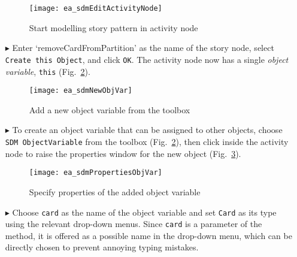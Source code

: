 \begin{itemize}
\begin{figure}[htpb]
\begin{center} 
  \texttt{[image: ea\_sdmEditActivityNode]}
  \caption{Start modelling story pattern in activity node}  
  \label{fig:story_pattern}
\end{center}
\end{figure}

\vspace{0.5cm}

\item[$\blacktriangleright$] Enter `removeCardFromPartition' as the name of the story node, select \texttt{Create this Object}, and click \texttt{OK}. The
activity node now has a single \emph{object variable}, \texttt{this} (Fig.~\ref{fig:tool_box}).

\begin{figure}[htp]
\begin{center}
  \texttt{[image: ea\_sdmNewObjVar]}
  \caption{Add a new object variable from the toolbox}  
  \label{fig:tool_box}
\end{center}
\end{figure}

\newpage

\item[$\blacktriangleright$] To create an object variable that can be assigned to other objects, choose \texttt{SDM ObjectVariable} from the toolbox
(Fig.~\ref{fig:tool_box}), then click inside the activity node to raise the properties window for the new object (Fig.~\ref{fig:object_variable_properties}).

\vspace{0.5cm}

\begin{figure}[htp]
\begin{center}
  \texttt{[image: ea\_sdmPropertiesObjVar]}
  \caption{Specify properties of the added object variable}  
  \label{fig:object_variable_properties}
\end{center}
\end{figure}


\item[$\blacktriangleright$] Choose \texttt{card} as the name of the object variable and set \texttt{Card} as its type using the relevant drop-down menus.
Since \texttt{card} is a parameter of the method, it is offered as a possible name in the drop-down menu, which can be directly chosen to prevent annoying
typing mistakes.


\end{itemize}
